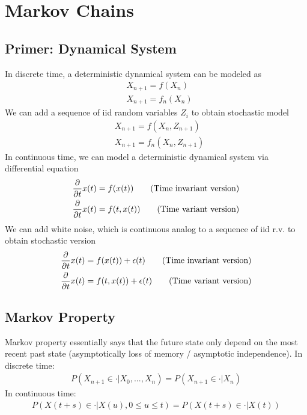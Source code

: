 \chapter{Markov Chains}

\section{Primer: Dynamical System} 
In discrete time, a deterministic dynamical system can be modeled as 
    \begin{align*}
        & X_{n+1} = f(X_n) \tag{Time invariant version} \\
        & X_{n+1} = f_n(X_n) \tag{Time variant version} 
    \end{align*}
We can add a sequence of iid random variables $Z_i$ to obtain stochastic model
    \begin{align*}
        & X_{n+1} = f(X_n, Z_{n+1}) \tag{Time invariant version} \\
        & X_{n+1} = f_n(X_n, Z_{n+1}) \tag{Time variant version}        
    \end{align*}
In continuous time, we can model a deterministic dynamical system via differential equation
    \begin{align*}
        & \frac{\partial}{\partial t} x(t) = f(x(t)) \tag{Time invariant version} \\
        & \frac{\partial}{\partial t} x(t) = f(t, x(t)) \tag{Time variant version} \\
    \end{align*}
We can add white noise, which is continuous analog to a sequence of iid r.v. to obtain stochastic version 
    \begin{align*}
        & \frac{\partial}{\partial t} x(t) = f(x(t)) + \epsilon(t) \tag{Time invariant version} \\
        & \frac{\partial}{\partial t} x(t) = f(t, x(t)) + \epsilon(t) \tag{Time variant version} \\
    \end{align*}


\section{Markov Property}
Markov property essentially says that the future state only depend on the most recent past state (asymptotically loss of memory / asymptotic independence). In discrete time:
    \begin{align*}
        P(X_{n+1} \in \cdot | X_0, ..., X_n) = P(X_{n+1} \in \cdot | X_n)
    \end{align*}
In continuous time: 
    \begin{align*}
        P(X(t+s) \in \cdot | X(u), 0 \leq u \leq t) = P(X(t+s)\in \cdot | X(t))
    \end{align*}

